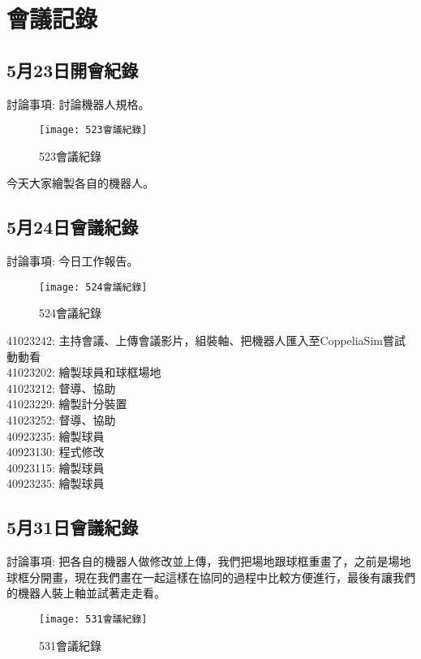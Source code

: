 \chapter{會議記錄}
\section{5月23日開會紀錄}
討論事項: 討論機器人規格。\\[6pt]
\begin{figure}[hbt!]
\begin{center}
\label{523會議紀錄}
\texttt{[image: 523會議紀錄]}
\caption{\Large 523會議紀錄}
\end{center}
\end{figure}
今天大家繪製各自的機器人。\\

\section{5月24日會議紀錄}
討論事項: 今日工作報告。\\
\begin{figure}[hbt!]
\begin{center}
\label{524會議紀錄}
\texttt{[image: 524會議紀錄]}
\caption{\Large 524會議紀錄}
\end{center}
\end{figure}
41023242: 主持會議、上傳會議影片，組裝軸、把機器人匯入至CoppeliaSim嘗試動動看\\

41023202: 繪製球員和球框場地\\

41023212: 督導、協助\\

41023229: 繪製計分裝置\\

41023252: 督導、協助\\

40923235: 繪製球員\\

40923130: 程式修改\\ 

40923115: 繪製球員\\ 

40923235: 繪製球員\\ 

\section{5月31日會議紀錄}
討論事項: 把各自的機器人做修改並上傳，我們把場地跟球框重畫了，之前是場地球框分開畫，現在我們畫在一起這樣在協同的過程中比較方便進行，最後有讓我們的機器人裝上軸並試著走走看。\\
\begin{figure}[hbt!]
\begin{center}
\label{531會議紀錄}
\texttt{[image: 531會議紀錄]}
\caption{\Large 531會議紀錄}
\end{center}
\end{figure}

\newpage
